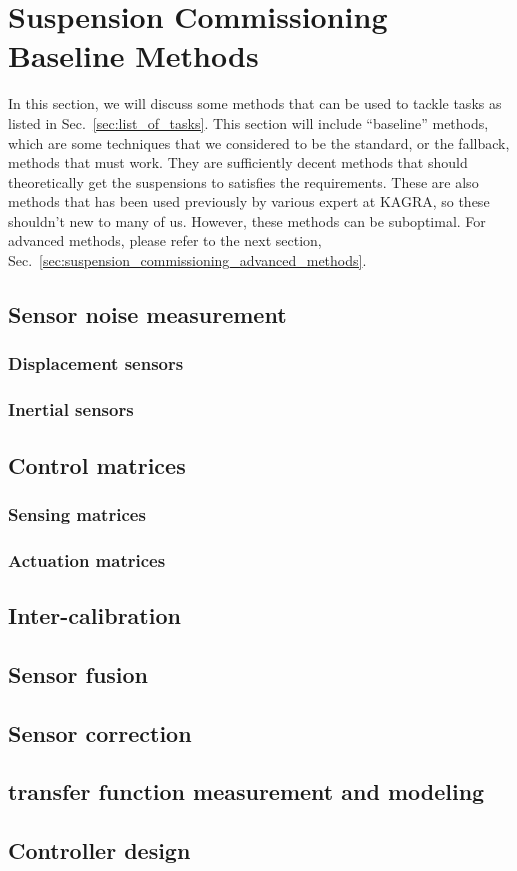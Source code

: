 \section{Suspension Commissioning Baseline Methods \label{sec:suspension_commissioning_baseline_methods}}
In this section, we will discuss some methods that can be used to tackle tasks as listed in Sec.~\ref{sec:list_of_tasks}.
This section will include ``baseline'' methods, which are some techniques that we considered to be the standard, or the fallback, methods that must work.
They are sufficiently decent methods that should theoretically get the suspensions to satisfies the requirements.
These are also methods that has been used previously by various expert at KAGRA, so these shouldn't new to many of us.
However, these methods can be suboptimal.
For advanced methods, please refer to the next section, Sec.~\ref{sec:suspension_commissioning_advanced_methods}.

\subsection{Sensor noise measurement}
\subsubsection{Displacement sensors}
\subsubsection{Inertial sensors}
\subsection{Control matrices}
\subsubsection{Sensing matrices}
\subsubsection{Actuation matrices}
\subsection{Inter-calibration}
\subsection{Sensor fusion}
\subsection{Sensor correction}
\subsection{transfer function measurement and modeling}
\subsection{Controller design}

